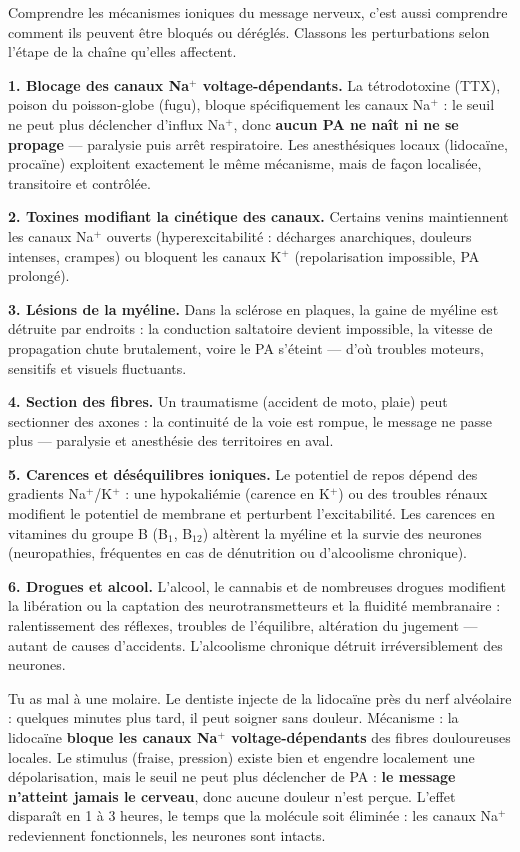 \documentclass[11pt]{article}
\newcommand{\cle}[1]{{\popxbold\color{popdark}#1}}
\newcounter{popsec}
\newcounter{popsub}
\newcommand{\courssub}[1]{%
  \stepcounter{popsub}%
  \par\vspace{9pt}\noindent{\popxbold\fontsize{11.5}{13}\selectfont\color{popink}{\color{poporange}\thepopsec.\thepopsub}\hspace{6pt}#1}\par\nopagebreak\vspace{4pt}
}
\begin{document}
\courssub{Facteurs perturbant le fonctionnement des neurones}

Comprendre les mécanismes ioniques du message nerveux, c'est aussi comprendre comment ils peuvent être bloqués ou déréglés. Classons les perturbations selon l'étape de la chaîne qu'elles affectent.

\textbf{1. Blocage des canaux Na$^+$ voltage-dépendants.} La \cle{tétrodotoxine} (TTX), poison du poisson-globe (fugu), bloque spécifiquement les canaux Na$^+$ : le seuil ne peut plus déclencher d'influx Na$^+$, donc \textbf{aucun PA ne naît ni ne se propage} — paralysie puis arrêt respiratoire. Les \cle{anesthésiques locaux} (lidocaïne, procaïne) exploitent exactement le même mécanisme, mais de façon localisée, transitoire et contrôlée.

\textbf{2. Toxines modifiant la cinétique des canaux.} Certains venins maintiennent les canaux Na$^+$ ouverts (hyperexcitabilité : décharges anarchiques, douleurs intenses, crampes) ou bloquent les canaux K$^+$ (repolarisation impossible, PA prolongé).

\textbf{3. Lésions de la myéline.} Dans la \cle{sclérose en plaques}, la gaine de myéline est détruite par endroits : la conduction saltatoire devient impossible, la vitesse de propagation chute brutalement, voire le PA s'éteint — d'où troubles moteurs, sensitifs et visuels fluctuants.

\textbf{4. Section des fibres.} Un traumatisme (accident de moto, plaie) peut sectionner des axones : la continuité de la voie est rompue, le message ne passe plus — paralysie et anesthésie des territoires en aval.

\textbf{5. Carences et déséquilibres ioniques.} Le potentiel de repos dépend des gradients Na$^+$/K$^+$ : une hypokaliémie (carence en K$^+$) ou des troubles rénaux modifient le potentiel de membrane et perturbent l'excitabilité. Les carences en vitamines du groupe B (B$_1$, B$_{12}$) altèrent la myéline et la survie des neurones (neuropathies, fréquentes en cas de dénutrition ou d'alcoolisme chronique).

\textbf{6. Drogues et alcool.} L'alcool, le cannabis et de nombreuses drogues modifient la libération ou la captation des neurotransmetteurs et la fluidité membranaire : ralentissement des réflexes, troubles de l'équilibre, altération du jugement — autant de causes d'accidents. L'alcoolisme chronique détruit irréversiblement des neurones.

\begin{exemplebox}
Tu as mal à une molaire. Le dentiste injecte de la lidocaïne près du nerf alvéolaire : quelques minutes plus tard, il peut soigner sans douleur. Mécanisme : la lidocaïne \textbf{bloque les canaux Na$^+$ voltage-dépendants} des fibres douloureuses locales. Le stimulus (fraise, pression) existe bien et engendre localement une dépolarisation, mais le seuil ne peut plus déclencher de PA : \textbf{le message n'atteint jamais le cerveau}, donc aucune douleur n'est perçue. L'effet disparaît en 1 à 3 heures, le temps que la molécule soit éliminée : les canaux Na$^+$ redeviennent fonctionnels, les neurones sont intacts.
\end{exemplebox}
\end{document}
